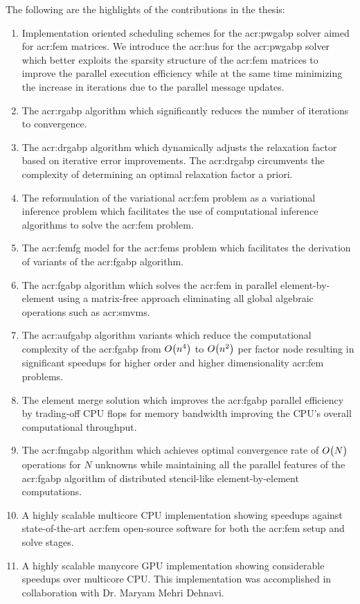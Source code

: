 The following are the highlights of the contributions in the thesis:
\begin{enumerate}
	\item Implementation oriented scheduling schemes for the \gls{acr:pwgabp} solver aimed for \gls{acr:fem} matrices.
		We introduce the \gls{acr:hus} for the \gls{acr:pwgabp} solver which better exploits the sparsity structure of the \gls{acr:fem} matrices to improve the parallel execution efficiency while at the same time minimizing the increase in iterations due to the parallel message updates.
	\item The \gls{acr:rgabp} algorithm which significantly reduces the number of iterations to convergence.
	\item The \gls{acr:drgabp} algorithm which dynamically adjusts the relaxation factor based on iterative error improvements.
		The \gls{acr:drgabp} circumvents the complexity of determining an optimal relaxation factor a priori.
	\item The reformulation of the variational \gls{acr:fem} problem as a variational inference problem which facilitates the use of computational inference algorithms to solve the \gls{acr:fem} problem.
	\item The \gls{acr:femfg} model for the \glspl{acr:fem} problem which facilitates the derivation of variants of the \gls{acr:fgabp} algorithm.
	\item The \gls{acr:fgabp} algorithm which solves the \gls{acr:fem} in parallel element-by-element using a matrix-free approach eliminating all global algebraic operations such as \glspl{acr:smvm}.
	\item The \gls{acr:aufgabp} algorithm variants which reduce the computational complexity of the \gls{acr:fgabp} from $ O\bigl(n^4\bigr)$ to $ O\bigl(n^2\bigr)$ per factor node resulting in significant speedups for higher order and higher dimensionality \gls{acr:fem} problems.
	\item The element merge solution which improves the \gls{acr:fgabp} parallel efficiency by trading-off CPU flops for memory bandwidth improving the CPU's overall computational throughput.
	\item The \gls{acr:fmgabp} algorithm which achieves optimal convergence rate of $ O\bigl(N\bigr)$ operations for $N$ unknowns while maintaining all the parallel features of the \gls{acr:fgabp} algorithm of distributed stencil-like element-by-element computations.
	\item A highly scalable multicore CPU implementation showing speedups against state-of-the-art \gls{acr:fem} open-source software for both the \gls{acr:fem} setup and solve stages.
	\item A highly scalable manycore GPU implementation showing considerable speedups over multicore CPU. 
		This implementation was accomplished in collaboration with Dr. Maryam Mehri Dehnavi.
\end{enumerate}


